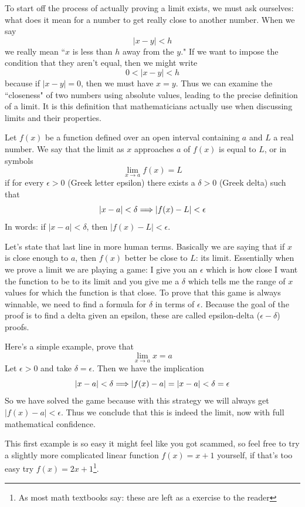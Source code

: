 To start off the process of actually proving a limit exists, we must ask ourselves: what does it mean for a number to get really close to another number. When we say
\[ |x - y| < h \]
we really mean ``$x$ is less than $h$ away from the $y$." If we want to impose the condition that they aren't equal, then we might write
\[ 0 < |x - y| < h \]
because if $|x - y| = 0$, then we must have $x = y$. Thus we can examine the ``closeness" of two numbers using absolute values, leading to the precise definition of a limit. It is this definition that mathematicians actually use when discussing limits and their properties.

\begin{definition}
	Let $f(x)$ be a function defined over an open interval containing $a$ and $L$ a real number. We say that the limit as $x$ approaches $a$ of $f(x)$ is equal to $L$, or in symbols
	\[ \lim_{x \to a} f(x) = L \]
	if for every $\epsilon > 0$ (Greek letter epsilon) there exists a $\delta > 0$ (Greek delta) such that
	\[ |x - a| < \delta \Longrightarrow |f(x) - L| < \epsilon \]
	In words: if $|x - a| < \delta$, then $|f(x) - L| < \epsilon$.
\end{definition}

Let's state that last line in more human terms. Basically we are saying that if $x$ is close enough to $a$, then $f(x)$ better be close to $L$: its limit. Essentially when we prove a limit we are playing a game: I give you an $\epsilon$ which is how close I want the function to be to its limit and you give me a $\delta$ which tells me the range of $x$ values for which the function is that close. To prove that this game is always winnable, we need to find a formula for $\delta$ in terms of $\epsilon$. Because the goal of the proof is to find a delta given an epsilon, these are called epsilon-delta ($\epsilon-\delta$) proofs.

\begin{example}
	Here's a simple example, prove that
	\[ \lim_{x \to a} x = a \]
	Let $\epsilon > 0$ and take $\delta = \epsilon$. Then we have the implication
	\[ |x - a| < \delta \Longrightarrow |f(x) - a| = |x - a| < \delta = \epsilon \]
	So we have solved the game because with this strategy we will always get $|f(x) - a| < \epsilon$. Thus we conclude that this is indeed the limit, now with full mathematical confidence.
\end{example}

This first example is so easy it might feel like you got scammed, so feel free to try a slightly more complicated linear function $f(x) = x + 1$ yourself, if that's too easy try $f(x) = 2x + 1$\footnote{As most math textbooks say: these are left as a exercise to the reader}.

